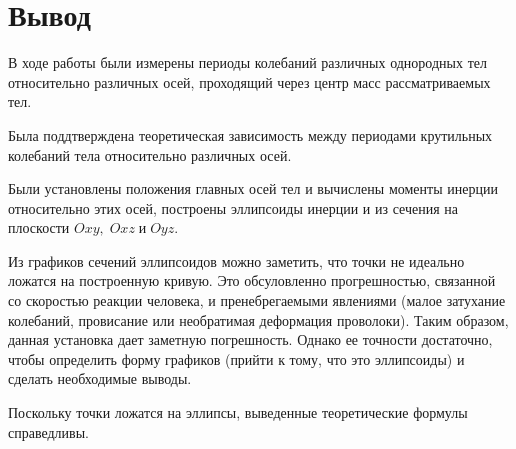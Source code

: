 \documentclass[a4paper, 12pt]{article}
\begin{document}
        
    \newpage
    
    \section*{Вывод}
        В ходе работы были измерены периоды колебаний различных однородных тел относительно различных осей, проходящий через центр масс рассматриваемых тел.
        
        Была поддтверждена теоретическая зависимость между периодами крутильных колебаний тела относительно 
        различных осей.
        
        Были установлены положения главных осей тел и вычислены моменты инерции относительно этих осей, построены эллипсоиды инерции и из сечения на плоскости $Oxy,\;Oxz\;и\;Oyz$.

        Из графиков сечений эллипсоидов можно заметить, что точки не идеально ложатся на построенную кривую. Это обсуловленно прогрешностью, связанной со скоростью реакции человека, и пренебрегаемыми явлениями (малое затухание колебаний, провисание или необратимая деформация проволоки). Таким образом, данная установка дает заметную погрешность. Однако ее точности достаточно, чтобы определить форму графиков (прийти к тому, что это эллипсоиды) и сделать необходимые выводы. 
        
        Поскольку точки ложатся на эллипсы, выведенные теоретические формулы справедливы.
\end{document}
